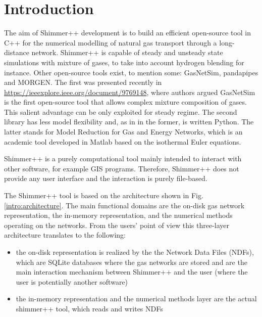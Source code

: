 \section{Introduction}

The aim of Shimmer++ development is to build an efficient open-source tool in C++ for the numerical modelling of natural gas transport through a long-distance network. Shimmer++ is capable of steady and unsteady state simulations with mixture of gases, to take into account hydrogen blending for instance. Other open-source tools exist, to mention some: GasNetSim, pandapipes and MORGEN. The first was presented recently in \url{https://ieeexplore.ieee.org/document/9769148}, where authors argued GasNetSim is the first open-source tool that allows complex mixture composition of gases. This salient advantage can be only exploited for steady regime. The second library has less model flexibility and, as in in the former, is written Python. The latter stands for Model Reduction for Gas and Energy Networks, which is an academic tool developed in Matlab based on the isothermal Euler equations.   

Shimmer++ is a purely computational tool mainly intended to interact with other software, for example GIS programs. Therefore, Shimmer++ does not provide any user interface and the interaction is purely file-based.

The Shimmer++ tool is based on the architecture shown in Fig. \ref{intro:architecture}. The main functional domains are the on-disk gas network representation, the in-memory representation, and the numerical methods operating on the networks. From the users' point of view this three-layer architecture translates to the following:
\begin{itemize}
    \item the on-disk representation is realized by the the Network Data Files (NDFs), which are SQLite databases where the gas networks are stored and are the main interaction mechanism between Shimmer++ and the user (where the user is potentially another software)
    \item the in-memory representation and the numerical methods layer are the actual shimmer++ tool, which reads and writes NDFs
\end{itemize}

